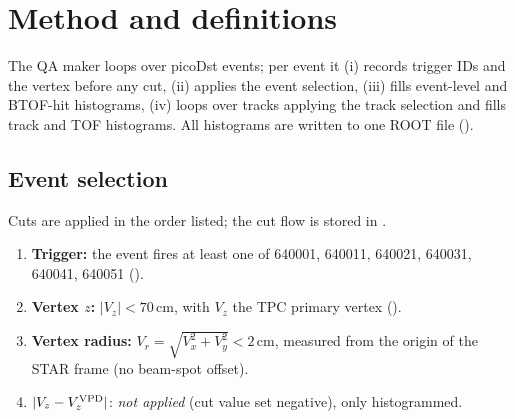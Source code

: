 \section{Method and definitions}
\label{sec:method}

The QA maker loops over picoDst events; per event it (i) records trigger IDs and the vertex before any
cut, (ii) applies the event selection, (iii) fills event-level and BTOF-hit histograms,
(iv) loops over tracks applying the track selection and fills track and TOF histograms.
All histograms are written to one ROOT file ().

\subsection{Event selection}
\label{sec:evtcuts}
Cuts are applied in the order listed; the cut flow is stored in .
\begin{enumerate}
\item \textbf{Trigger:} the event fires at least one of 640001, 640011, 640021, 640031, 640041, 640051
  ().
\item \textbf{Vertex $z$:} $|V_z|<70$\,cm, with $V_z$ the TPC primary vertex ().
\item \textbf{Vertex radius:} $V_r=\sqrt{V_x^2+V_y^2}<2$\,cm, measured from the origin of the STAR frame (no beam-spot offset).
\item $|V_z-V_z^{\rm VPD}|$: \emph{not applied} (cut value set negative), only histogrammed.
\end{enumerate}




